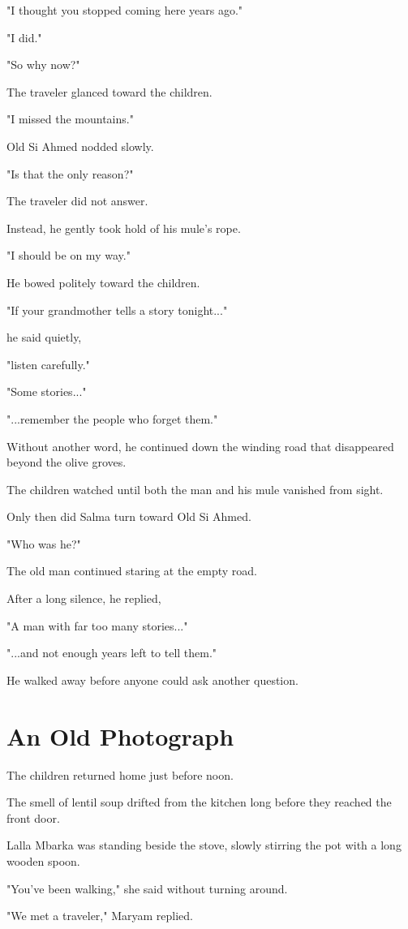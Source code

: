 \documentclass[12pt,openany]{book}
\begin{document}
"I thought you stopped coming here years ago."

"I did."

"So why now?"

The traveler glanced toward the children.

"I missed the mountains."

Old Si Ahmed nodded slowly.

"Is that the only reason?"

The traveler did not answer.

Instead, he gently took hold of his mule's rope.

"I should be on my way."

He bowed politely toward the children.

"If your grandmother tells a story tonight..."

he said quietly,

"listen carefully."

"Some stories..."

"...remember the people who forget them."

Without another word, he continued down the winding road that disappeared beyond the olive groves.

The children watched until both the man and his mule vanished from sight.

Only then did Salma turn toward Old Si Ahmed.

"Who was he?"

The old man continued staring at the empty road.

After a long silence, he replied,

"A man with far too many stories..."

"...and not enough years left to tell them."

He walked away before anyone could ask another question.
\section*{An Old Photograph}

The children returned home just before noon.

The smell of lentil soup drifted from the kitchen long before they reached the front door.

Lalla Mbarka was standing beside the stove, slowly stirring the pot with a long wooden spoon.

"You've been walking," she said without turning around.

"We met a traveler," Maryam replied.
\end{document}
